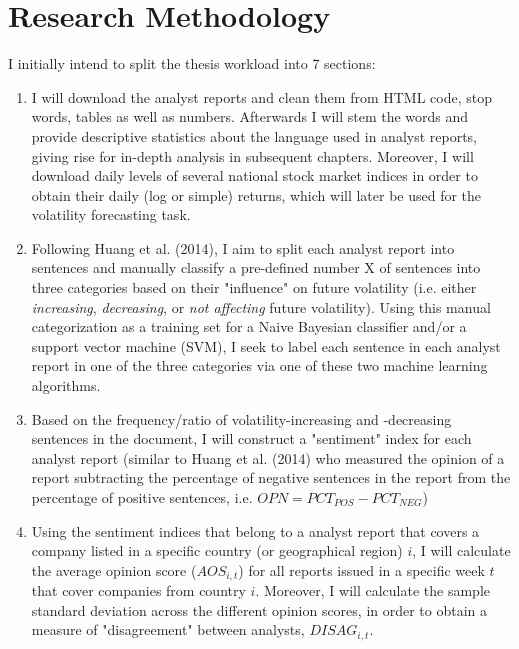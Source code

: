 \documentclass[12pt, a4paper]{article}
\begin{document}
\section*{Research Methodology}
I initially intend to split the thesis workload into 7 sections:
\begin{enumerate}
\item I will download the analyst reports and clean them from HTML code, stop words, tables as well as numbers. Afterwards I will stem the words and provide descriptive statistics about the language used in analyst reports, giving rise for in-depth analysis in subsequent chapters. Moreover, I will download daily levels of several national stock market indices in order to obtain their daily (log or simple) returns, which will later be used for the  volatility forecasting task.
\item Following Huang et al. (2014), I aim to split each analyst report into sentences and manually classify a pre-defined number X of sentences into three categories based on their "influence" on future volatility (i.e. either \textit{increasing}, \textit{decreasing}, or \textit{not affecting} future volatility). Using this manual categorization as a training set for a Naive Bayesian classifier and/or a support vector machine (SVM), I seek to label each sentence in each analyst report in one of the three categories via one of these two machine learning algorithms.
\item Based on the frequency/ratio of volatility-increasing and -decreasing sentences in the document, I will construct a "sentiment" index for each analyst report (similar to Huang et al. (2014) who measured the opinion of a report subtracting the percentage of negative sentences in the report from the percentage of positive sentences, i.e.  $OPN = PCT_{POS} - PCT_{NEG}$)
\item Using the sentiment indices that belong to a analyst report that covers a company listed in a specific country (or geographical region) $i$, I will calculate the average opinion score ($AOS_{i,t}$) for all reports issued in a specific week $t$ that cover companies from country $i$. Moreover, I will calculate the sample standard deviation across the different opinion scores, in order to obtain a measure of "disagreement" between analysts, $DISAG_{i,t}$.


\end{enumerate}
\end{document}
